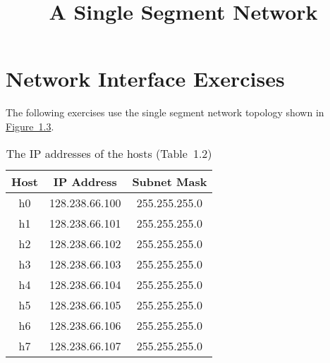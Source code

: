 \documentclass{../UTNetLab}
\title{A Single Segment Network}
\begin{document}
\part{Network Interface Exercises}
    The following exercises use the single segment network topology shown in \hyperref[fig:1.3]{Figure~1.3}.
    \begin{center}
        \begin{minipage}{0.48\textwidth}
            \begin{flushleft}
                \begin{table}[H]
                    \caption{The IP addresses of the hosts (Table~1.2)}
                    \centering
                    \begin{tabular}{ c c c }
                        \hline \hline
                        Host & IP Address & Subnet Mask \\
                        \hline 
                        h0 & 128.238.66.100 & 255.255.255.0 \\
                        h1 & 128.238.66.101 & 255.255.255.0 \\
                        h2 & 128.238.66.102 & 255.255.255.0 \\
                        h3 & 128.238.66.103 & 255.255.255.0 \\
                        h4 & 128.238.66.104 & 255.255.255.0 \\
                        h5 & 128.238.66.105 & 255.255.255.0 \\
                        h6 & 128.238.66.106 & 255.255.255.0 \\
                        h7 & 128.238.66.107 & 255.255.255.0 \\
                        \hline \hline
                        \end{tabular}
                \end{table}
            \end{flushleft}
        \end{minipage}
        \begin{minipage}{0.48\textwidth}
            \begin{flushright}
                \begin{figure}[H]
                    \centering
\end{figure}
\end{flushright}
\end{minipage}
\end{center}
\end{document}
